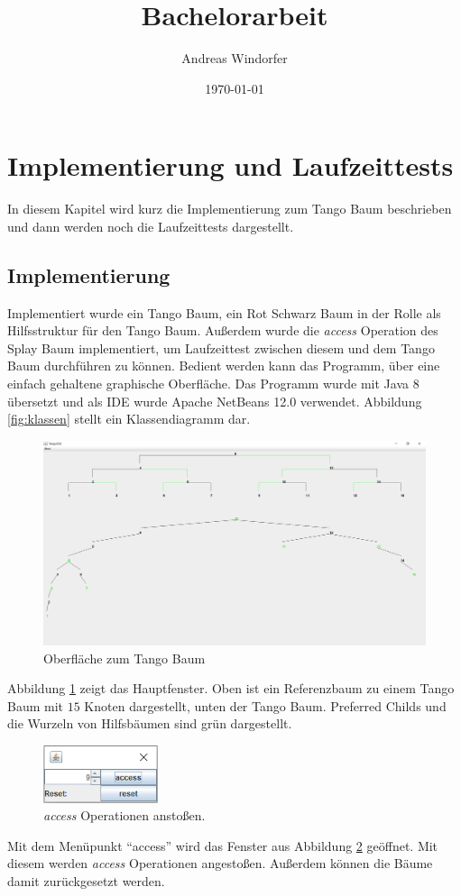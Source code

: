 \documentclass[a4paper,12pt]{article}
\title{Bachelorarbeit}
\author{
	Andreas Windorfer\\
}
\date{\today}
\begin{document}
\tableofcontents
\section{Implementierung und Laufzeittests}
In diesem Kapitel wird kurz die Implementierung zum Tango Baum beschrieben und dann werden noch die Laufzeittests dargestellt. 
\subsection{Implementierung}
Implementiert wurde ein Tango Baum, ein Rot Schwarz Baum in der Rolle als Hilfsstruktur für den Tango Baum. Außerdem wurde die \textit{access} Operation des Splay Baum implementiert, um Laufzeittest zwischen diesem und dem Tango Baum durchführen zu können. Bedient werden kann das Programm, über eine einfach gehaltene graphische Oberfläche. Das Programm wurde mit Java 8 übersetzt und als IDE wurde Apache NetBeans 12.0 verwendet. Abbildung \ref{fig:klassen} stellt ein Klassendiagramm dar.
\begin{figure}[h]
	\centering
	\includegraphics[width= 1\textwidth]{"Medien/laufzeittest/MainGUI"}
	\caption{Oberfläche zum Tango Baum}
	\label{fig:TangoBaumGui}
\end{figure}

\noindent Abbildung \ref{fig:TangoBaumGui} zeigt das Hauptfenster. Oben ist ein Referenzbaum zu einem Tango Baum mit  $15$ Knoten dargestellt, unten der Tango Baum. Preferred Childs und die Wurzeln von Hilfsbäumen sind grün dargestellt.


\begin{figure}[h]
	\centering
	\includegraphics[width=0.3\textwidth]{"Medien/laufzeittest/accessGUI"}
	\caption{\textit{access} Operationen anstoßen.}
	\label{fig:accessGui}
\end{figure}
\noindent Mit dem Menüpunkt \enquote{access} wird das Fenster aus Abbildung \ref{fig:accessGui} geöffnet. Mit diesem werden \textit{access} Operationen angestoßen. Außerdem können die Bäume damit zurückgesetzt werden.
\end{document}

